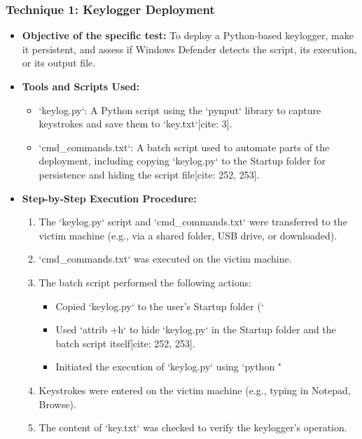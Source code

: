 \documentclass[11pt]{article}
\begin{document}
	\subsubsection{Technique 1: Keylogger Deployment}
	\begin{itemize}
		\item \textbf{Objective of the specific test:} To deploy a Python-based keylogger, make it persistent, and assess if Windows Defender detects the script, its execution, or its output file.
		\item \textbf{Tools and Scripts Used:}
		\begin{itemize}
			\item `keylog.py`: A Python script using the `pynput` library to capture keystrokes and save them to `key.txt`[cite: 3].
			\item `cmd_commands.txt`: A batch script used to automate parts of the deployment, including copying `keylog.py` to the Startup folder for persistence and hiding the script file[cite: 252, 253].
		\end{itemize}
		\item \textbf{Step-by-Step Execution Procedure:}
		\begin{enumerate}
			\item The `keylog.py` script and `cmd_commands.txt` were transferred to the victim machine (e.g., via a shared folder, USB drive, or downloaded).
			\item `cmd_commands.txt` was executed on the victim machine.
			\item The batch script performed the following actions:
			\begin{itemize}
				\item Copied `keylog.py` to the user's Startup folder (`%
				\item Used `attrib +h` to hide `keylog.py` in the Startup folder and the batch script itself[cite: 252, 253].
				\item Initiated the execution of `keylog.py` using `python "%
			\end{itemize}
			\item Keystrokes were entered on the victim machine (e.g., typing in Notepad, Browse).
			\item The content of `key.txt` was checked to verify the keylogger's operation.
		\end{enumerate}

\end{itemize}
\end{document}
